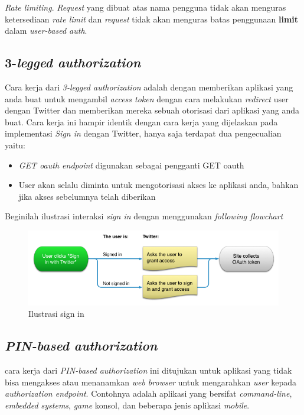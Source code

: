 \textit{Rate limiting}. \textit{Request} yang dibuat atas nama pengguna tidak akan menguras ketersediaan \textit{rate limit} dan \textit{request} tidak akan menguras batas penggunaan \textbf{limit} dalam \textit{user-based auth}.


\subsection{3-\textit{legged authorization}}
Cara kerja dari \textit{3-legged authorization} adalah dengan memberikan aplikasi yang anda buat untuk mengambil \textit{access token} dengan cara melakukan \textit{redirect} user dengan Twitter dan memberikan mereka sebuah otorisasi dari aplikasi yang anda buat. Cara kerja ini hampir identik dengan cara kerja yang dijelaskan pada implementasi \textit{Sign in} dengan Twitter, hanya saja terdapat dua pengecualian yaitu:

\begin{itemize}
	\item \textit{GET oauth endpoint} digunakan sebagai pengganti GET oauth
	\item User akan selalu diminta untuk mengotorisasi akses ke aplikasi anda, bahkan jika akses sebelumnya telah diberikan
\end{itemize}

Beginilah ilustrasi interaksi \textit{sign in} dengan menggunakan \textit{following flowchart}

\begin{figure}[H]
	\centering
		\includegraphics[width=1.00\textwidth]{Gambar/sign-in-flow3-3legged.png}
	\caption{Ilustrasi sign in}
	\label{fig:sign-in-flow3-3legged}
\end{figure}

\subsection{\textit{PIN-based authorization}}
cara kerja dari \textit{PIN-based authorization} ini ditujukan untuk aplikasi yang tidak bisa mengakses atau menanamkan \textit{web browser} untuk mengarahkan \textit{user} kepada \textit{authorization endpoint}. Contohnya adalah aplikasi yang bersifat \textit{command-line}, \textit{embedded systems}, \textit{game} konsol, dan beberapa jenis aplikasi \textit{mobile}.



